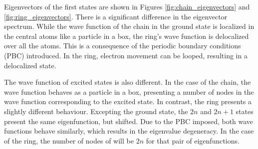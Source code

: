 \documentclass[twocolumn]{article}
\begin{document}
Eigenvectors of the first states are shown in Figures \ref{fig:chain_eigenvectors} and \ref{fig:ring_eigenvectors}. There is a significant difference in the eigenvector spectrum. While the wave function of the chain in the ground state is localized in the central atoms like a particle in a box, the ring's wave function is delocalized over all the atoms. This is a consequence of the periodic boundary conditions (PBC) introduced. In the ring, electron movement can be looped, resulting in a delocalized state.

The wave function of excited states is also different. In the case of the chain, the wave function behaves as a particle in a box, presenting a number of nodes in the wave function corresponding to the excited state. In contrast, the ring presents a slightly different behaviour. Excepting the ground state, the $2n$ and $2n+1$ states present the same eigenfunction, but shifted. Due to the PBC imposed, both wave functions behave similarly, which results in the eigenvalue degeneracy. In the case of the ring, the number of nodes of will be $2n$ for that pair of eigenfunctions. 
\end{document}
